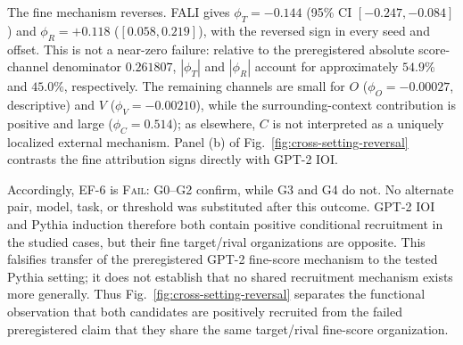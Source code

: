 The fine mechanism reverses. FALI gives $\phi_T=-0.144$ (95\% CI $[-0.247,-0.084]$) and $\phi_R=+0.118$ ($[0.058,0.219]$), with the reversed sign in every seed and offset. This is not a near-zero failure: relative to the preregistered absolute score-channel denominator $0.261807$, $|\phi_T|$ and $|\phi_R|$ account for approximately $54.9\%$ and $45.0\%$, respectively. The remaining channels are small for $O$ ($\phi_O=-0.00027$, descriptive) and $V$ ($\phi_V=-0.00210$), while the surrounding-context contribution is positive and large ($\phi_C=0.514$); as elsewhere, $C$ is not interpreted as a uniquely localized external mechanism. Panel (b) of Fig.~\ref{fig:cross-setting-reversal} contrasts the fine attribution signs directly with GPT-2 IOI.

Accordingly, EF-6 is \textsc{Fail}: G0--G2 confirm, while G3 and G4 do not. No alternate pair, model, task, or threshold was substituted after this outcome. GPT-2 IOI and Pythia induction therefore both contain positive conditional recruitment in the studied cases, but their fine target/rival organizations are opposite. This falsifies transfer of the preregistered GPT-2 fine-score mechanism to the tested Pythia setting; it does not establish that no shared recruitment mechanism exists more generally. Thus Fig.~\ref{fig:cross-setting-reversal} separates the functional observation that both candidates are positively recruited from the failed preregistered claim that they share the same target/rival fine-score organization.


